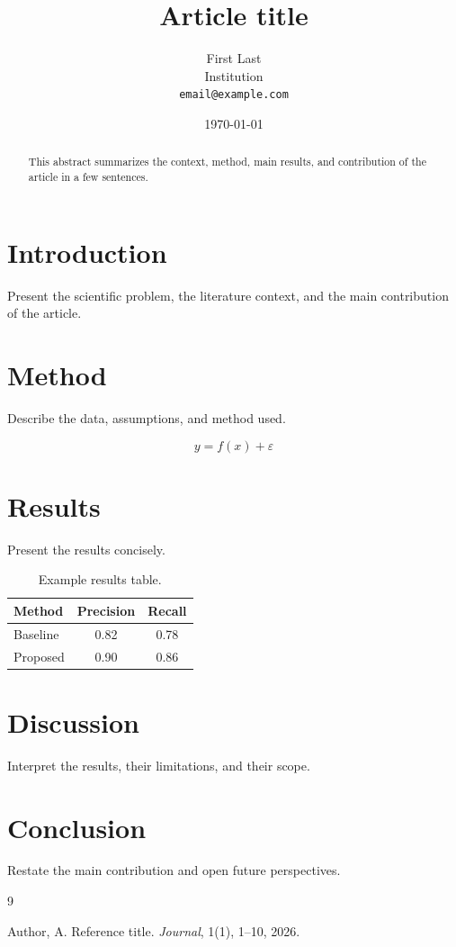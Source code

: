\documentclass[11pt,a4paper]{article}
\title{Article title}
\author{First Last\\Institution\\\texttt{email@example.com}}
\date{\today}
\begin{document}
\maketitle

\begin{abstract}
This abstract summarizes the context, method, main results, and contribution of the article in a few sentences.
\end{abstract}

\section{Introduction}

Present the scientific problem, the literature context, and the main contribution of the article.

\section{Method}

Describe the data, assumptions, and method used.

\begin{equation}
  y = f(x) + \varepsilon
\end{equation}

\section{Results}

Present the results concisely.

\begin{table}[h]
  \centering
  \caption{Example results table.}
  \begin{tabular}{lcc}
    \toprule
    Method & Precision & Recall \\
    \midrule
    Baseline & 0.82 & 0.78 \\
    Proposed & 0.90 & 0.86 \\
    \bottomrule
  \end{tabular}
  \label{tab:results}
\end{table}

\section{Discussion}

Interpret the results, their limitations, and their scope.

\section{Conclusion}

Restate the main contribution and open future perspectives.

\begin{thebibliography}{9}

Author, A.
\newblock Reference title.
\newblock \emph{Journal}, 1(1), 1--10, 2026.

\end{thebibliography}
\end{document}
